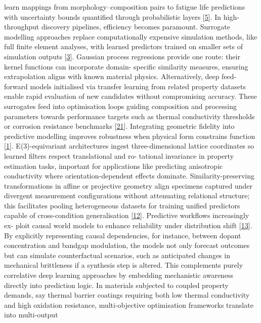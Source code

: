 \documentclass[
]{article}
\begin{document}
learn mappings from morphology--composition pairs to fatigue life
predictions with uncertainty bounds quantified through probabilistic
layers {[}\hyperref[_bookmark45]{5}{]}. In high-throughput discovery
pipelines, efficiency becomes paramount. Surrogate modelling approaches
replace computationally expensive simulation methods, like full finite
element analyses, with learned predictors trained on smaller sets of
simulation outputs {[}\hyperref[_bookmark43]{3}{]}. Gaussian process
regressions provide one route: their kernel functions can incorporate
domain- specific similarity measures, ensuring extrapolation aligns with
known material physics. Alternatively, deep feed-forward models
initialised via transfer learning from related property datasets enable
rapid evaluation of new candidates without compromising accuracy. These
surrogates feed into optimisation loops guiding composition and
processing parameters towards performance targets such as thermal
conductivity thresholds or corrosion resistance benchmarks
{[}\hyperref[_bookmark61]{21}{]}. Integrating geometric fidelity into
predictive modelling improves robustness when physical form constrains
function {[}\hyperref[_bookmark41]{1}{]}. E(3)-equivariant architectures
ingest three-dimensional lattice coordinates so learned filters respect
translational and ro- tational invariance in property estimation tasks,
important for applications like predicting anisotropic conductivity
where orientation-dependent effects dominate. Similarity-preserving
transformations in affine or projective geometry align specimens
captured under divergent measurement configurations without attenuating
relational structure; this facilitates pooling heterogeneous datasets
for training unified predictors capable of cross-condition
generalisation {[}\hyperref[_bookmark52]{12}{]}. Predictive workflows
increasingly ex- ploit causal world models to enhance reliability under
distribution shift {[}\hyperref[_bookmark53]{13}{]}. By explicitly
representing causal dependencies, for instance, between dopant
concentration and bandgap modulation, the models not only forecast
outcomes but can simulate counterfactual scenarios, such as anticipated
changes in mechanical brittleness if a synthesis step is altered. This
complements purely correlative deep learning approaches by embedding
mechanistic awareness directly into prediction logic. In materials
subjected to coupled property demands, say thermal barrier coatings
requiring both low thermal conductivity and high oxidation resistance,
multi-objective optimisation frameworks translate into multi-output
\end{document}
